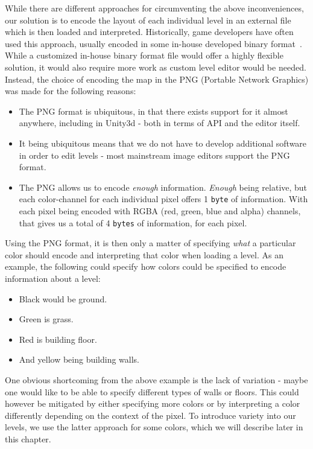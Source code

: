 While there are different approaches for circumventing the above
inconveniences, our solution is to encode the layout of each individual level
in an external file which is then loaded and interpreted.  Historically, game
developers have often used this approach, usually encoded in some in-house
developed binary format~\cite{quake-bsp-format}. While a customized in-house
binary format file would offer a highly flexible solution, it would also
require more work as custom level editor would be needed.  Instead, the choice
of encoding the map in the PNG (Portable Network Graphics) was made for the
following reasons:

\begin{itemize}
    \item The PNG format is ubiquitous, in that there exists support for it
        almost anywhere, including in Unity3d - both in terms of API and the
        editor itself.
    \item It being ubiquitous means that we do not have to develop additional
        software in order to edit levels - most mainstream image editors
        support the PNG format.
    \item The PNG allows us to encode \textit{enough} information.
        \textit{Enough} being relative, but each color-channel for each
        individual pixel offers 1 \texttt{byte} of information. With each pixel
        being encoded with RGBA (red, green, blue and alpha) channels, that
        gives us a total of 4 \texttt{bytes} of information, for each pixel.
\end{itemize}

Using the PNG format, it is then only a matter of specifying \textit{what} a
particular color should encode and interpreting that color when loading a
level.  As an example, the following could specify how colors could be
specified to encode information about a level:
\begin{itemize}
    \item Black would be ground.
    \item Green is grass.
    \item Red is building floor.
    \item And yellow being building walls.
\end{itemize}

One obvious shortcoming from the above example is the lack of variation - maybe
one would like to be able to specify different types of walls or floors. This
could however be mitigated by either specifying more colors or by interpreting
a color differently depending on the context of the pixel.  To introduce
variety into our levels, we use the latter approach for some colors, which we
will describe later in this chapter.
\\

